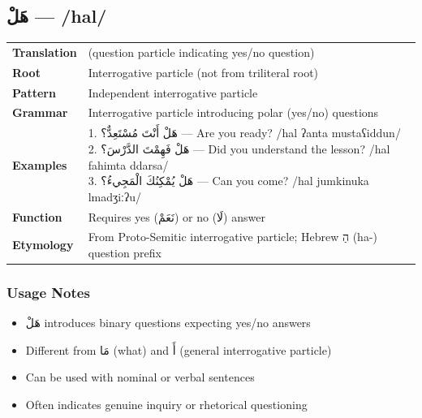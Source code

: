 \documentclass[letterpaper,12pt]{article}
\begin{document}
\subsection{\textarabic{هَلْ} — /hal/}
\begin{tabular}{p{3cm}p{10cm}}
\toprule
\textbf{Translation} & (question particle indicating yes/no question) \\
\textbf{Root} & Interrogative particle (not from triliteral root) \\
\textbf{Pattern} & Independent interrogative particle \\
\textbf{Grammar} & Interrogative particle introducing polar (yes/no) questions \\
\midrule
\textbf{Examples} & \makecell[l]{\parbox{9.5cm}{
1. \textarabic{هَلْ أَنْتَ مُسْتَعِدٌّ؟} — Are you ready? /hal ʔanta mustaʕiddun/\\
2. \textarabic{هَلْ فَهِمْتَ الدَّرْسَ؟} — Did you understand the lesson? /hal fahimta ddarsa/\\
3. \textarabic{هَلْ يُمْكِنُكَ الْمَجِيءُ؟} — Can you come? /hal jumkinuka lmadʒiːʔu/
}} \\
\midrule
\textbf{Function} & Requires yes (\textarabic{نَعَمْ}) or no (\textarabic{لَا}) answer \\
\textbf{Etymology} & From Proto-Semitic interrogative particle; Hebrew \texthebrew{הַ} (ha-) question prefix \\
\bottomrule
\end{tabular}

\subsubsection*{Usage Notes}
\begin{itemize}
  \item \textarabic{هَلْ} introduces binary questions expecting yes/no answers
  \item Different from \textarabic{مَا} (what) and \textarabic{أَ} (general interrogative particle)
  \item Can be used with nominal or verbal sentences
  \item Often indicates genuine inquiry or rhetorical questioning
\end{itemize}
\end{document}
